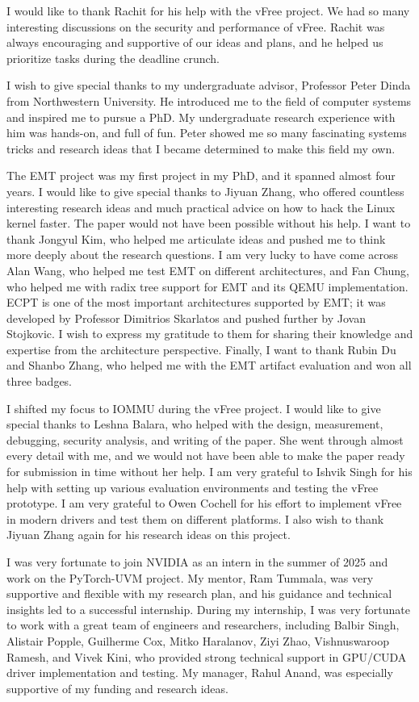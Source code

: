 \documentclass{uofithesis}
\begin{document}
{I would like to thank Rachit for his help with the vFree project.
We had so many interesting discussions on the security and performance of vFree.
Rachit was always encouraging and supportive of our ideas and plans,
and he helped us prioritize tasks during the deadline crunch.

I wish to give special thanks to my undergraduate advisor,
Professor Peter Dinda from Northwestern University.
He introduced me to the field of computer systems and inspired me to pursue a PhD.
My undergraduate research experience with him was hands-on, and full of fun.
Peter showed me so many fascinating systems tricks and research ideas
that I became determined to make this field my own.

The EMT project was my first project in my PhD, and it spanned almost four years.
I would like to give special thanks to Jiyuan Zhang, who offered countless interesting research ideas
and much practical advice on how to hack the Linux kernel faster.
The paper would not have been possible without his help.
I want to thank Jongyul Kim, who helped me articulate ideas and pushed me to think more deeply about the research questions.
I am very lucky to have come across Alan Wang, who helped me test EMT on different architectures,
and Fan Chung, who helped me with radix tree support for EMT and its QEMU implementation.
ECPT is one of the most important architectures supported by EMT; it was developed by Professor Dimitrios Skarlatos
and pushed further by Jovan Stojkovic. I wish to express my gratitude to them for sharing their knowledge and expertise
from the architecture perspective.
Finally, I want to thank Rubin Du and Shanbo Zhang, who helped me with the EMT artifact evaluation and won
all three badges.

I shifted my focus to IOMMU during the vFree project.
I would like to give special thanks to Leshna Balara, who helped
with the design, measurement, debugging, security analysis, and writing of the paper.
She went through almost every detail with me, and we would not have been able to make the paper ready for submission
in time without her help.
I am very grateful to Ishvik Singh for his help with setting up various evaluation environments and testing the vFree prototype.
I am very grateful to Owen Cochell for his effort to implement vFree in modern drivers and test them on different platforms.
I also wish to thank Jiyuan Zhang again for his research ideas on this project.

I was very fortunate to join NVIDIA as an intern in the summer of 2025
and work on the PyTorch-UVM project.
My mentor, Ram Tummala, was very supportive and flexible with my research plan,
and his guidance and technical insights led to a successful internship.
During my internship, I was very fortunate to work with a great team of engineers and researchers,
including Balbir Singh, Alistair Popple, Guilherme Cox, Mitko Haralanov, Ziyi Zhao, Vishnuswaroop Ramesh,
and Vivek Kini, who provided strong technical support in GPU/CUDA driver implementation and testing.
My manager, Rahul Anand, was especially supportive of my funding and research ideas.

}
\end{document}
